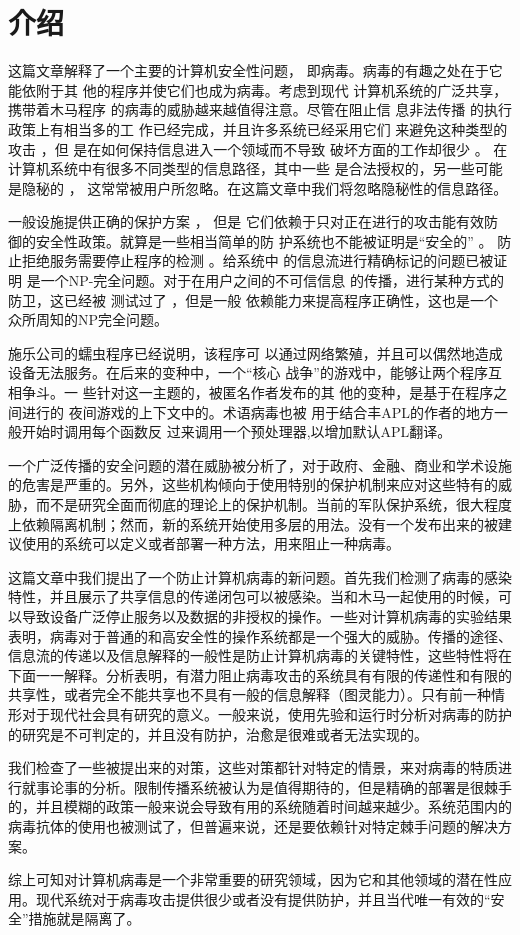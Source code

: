 \chapter{介绍}

这篇文章解释了一个主要的计算机安全性问题，
即病毒。病毒的有趣之处在于它能依附于其
他的程序并使它们也成为病毒。考虑到现代
计算机系统的广泛共享，携带着木马程序
的病毒的威胁越来越值得注意。尽管在阻止信
息非法传播
的执行政策上有相当多的工
作已经完成，并且许多系统已经采用它们
来避免这种类型的攻击
，但
是在如何保持信息进入一个领域而不导致
破坏方面的工作却很少
。
在计算机系统中有很多不同类型的信息路径，其中一些
是合法授权的，另一些可能是隐秘的
，
这常常被用户所忽略。在这篇文章中我们将忽略隐秘性的信息路径。

一般设施提供正确的保护方案
，
但是
它们依赖于只对正在进行的攻击能有效防
御的安全性政策。就算是一些相当简单的防
护系统也不能被证明是“安全的”
。
防止拒绝服务需要停止程序的检测
。给系统中
的信息流进行精确标记的问题已被证明
是一个NP-完全问题。对于在用户之间的不可信信息
的传播，进行某种方式的防卫，这已经被
测试过了
，但是一般
依赖能力来提高程序正确性，这也是一个
众所周知的NP完全问题。

施乐公司的蠕虫程序已经说明，该程序可
以通过网络繁殖，并且可以偶然地造成
设备无法服务。在后来的变种中，一个“核心
战争”的游戏中，能够让两个程序互相争斗。一
些针对这一主题的，被匿名作者发布的其
他的变种，是基于在程序之间进行的
夜间游戏的上下文中的。术语病毒也被
用于结合丰APL的作者的地方一般开始时调用每个函数反
过来调用一个预处理器,以增加默认APL翻译。

一个广泛传播的安全问题的潜在威胁被分析了，对于政府、金融、商业和学术设施的危害是严重的。另外，这些机构倾向于使用特别的保护机制来应对这些特有的威胁，而不是研究全面而彻底的理论上的保护机制。当前的军队保护系统，很大程度上依赖隔离机制；然而，新的系统开始使用多层的用法。没有一个发布出来的被建议使用的系统可以定义或者部署一种方法，用来阻止一种病毒。


这篇文章中我们提出了一个防止计算机病毒的新问题。首先我们检测了病毒的感染特性，并且展示了共享信息的传递闭包可以被感染。当和木马一起使用的时候，可以导致设备广泛停止服务以及数据的非授权的操作。一些对计算机病毒的实验结果表明，病毒对于普通的和高安全性的操作系统都是一个强大的威胁。传播的途径、信息流的传递以及信息解释的一般性是防止计算机病毒的关键特性，这些特性将在下面一一解释。分析表明，有潜力阻止病毒攻击的系统具有有限的传递性和有限的共享性，或者完全不能共享也不具有一般的信息解释（图灵能力）。只有前一种情形对于现代社会具有研究的意义。一般来说，使用先验和运行时分析对病毒的防护的研究是不可判定的，并且没有防护，治愈是很难或者无法实现的。


我们检查了一些被提出来的对策，这些对策都针对特定的情景，来对病毒的特质进行就事论事的分析。限制传播系统被认为是值得期待的，但是精确的部署是很棘手的，并且模糊的政策一般来说会导致有用的系统随着时间越来越少。系统范围内的病毒抗体的使用也被测试了，但普遍来说，还是要依赖针对特定棘手问题的解决方案。
	


综上可知对计算机病毒是一个非常重要的研究领域，因为它和其他领域的潜在性应用。现代系统对于病毒攻击提供很少或者没有提供防护，并且当代唯一有效的“安全”措施就是隔离了。












